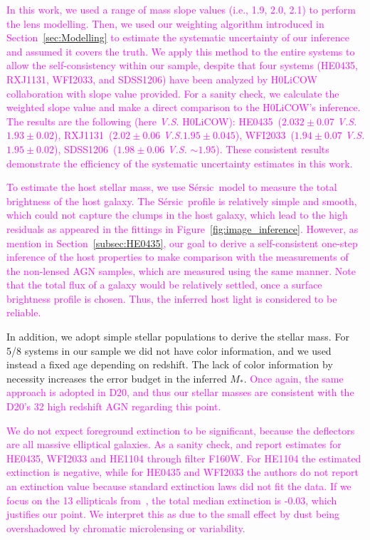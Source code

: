 \documentclass[fleqn,usenatbib]{mnras}
\newcommand{\sersic}{S\'ersic}
\newcommand{\mstar}{{$M_*$}}
\newcommand{\pink}[1]{{\textcolor{magenta}{#1}}}
\begin{document}
\pink{In this work, we used a range of mass slope values (i.e., 1.9, 2.0, 2.1) to perform the lens modelling. Then, we used our weighting algorithm introduced in Section~\ref{sec:Modelling} to estimate the systematic uncertainty of our inference and assumed it covers the truth. We apply this method to the entire systems to allow the self-consistency within our sample, despite that four systems (HE0435, RXJ1131, WFI2033, and SDSS1206) have been analyzed by H0LiCOW collaboration with slope value provided. For a sanity check, we calculate the weighted slope value and make a direct comparison to the H0LiCOW's inference. The results are the following (here {\it V.S.} H0LiCOW): HE0435~($2.032\pm 0.07$ {\it V.S.} $1.93\pm0.02$), RXJ1131~($2.02\pm 0.06$ {\it V.S.}$1.95\pm0.045$), WFI2033~($1.94\pm 0.07$ {\it V.S.} $1.95\pm0.02$), SDSS1206~($1.98\pm 0.06$ {\it V.S.} $\sim1.95$). These consistent results demonstrate the efficiency of the systematic uncertainty estimates in this work.}

\pink{To estimate the host stellar mass, we use \sersic\ model to measure the total brightness of the host galaxy. The \sersic\ profile is relatively simple and smooth, which could not capture the clumps in the host galaxy, which lead to the high residuals as appeared in the fittings in Figure~\ref{fig:image_inference}. However, as mention in Section~\ref{subsec:HE0435}, our goal to derive a self-consistent one-step inference of the host properties to make comparison with the measurements of the non-lensed AGN samples, which are measured using the same manner. Note that the total flux of a galaxy would be relatively settled, once a surface brightness profile is chosen. Thus, the inferred host light is considered to be reliable.
}

In addition, we adopt simple stellar populations to derive the stellar mass. For 5/8 systems in our sample we did not have color information, and we used instead a fixed age depending on redshift. The lack of color information by necessity increases the error budget in the inferred \mstar. \pink{Once again, the same approach is adopted in D20, and thus our stellar masses are consistent with the D20's 32 high redshift AGN regarding this point.}

\pink{We do not expect foreground extinction to be significant, because the deflectors are all massive elliptical galaxies. As a sanity check, \citet{1999ApJ...523..617F} and \citet{2008A&A...485..403O} report estimates for HE0435, WFI2033 and HE1104 through filter F160W. For HE1104 the estimated extinction is negative, while for HE0435 and WFI2033 the authors do not report an extinction value because standard extinction laws did not fit the data.
If we focus on the 13 ellipticals from~\citet{1999ApJ...523..617F}, the total median extinction is -0.03, which justifies our point.
We interpret this as due to the small effect by dust being overshadowed by chromatic microlensing or variability.}
\end{document}
